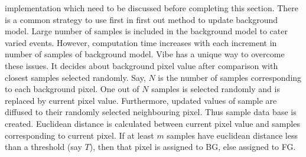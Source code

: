 implementation which need to be discussed before completing this
section. There is a common strategy to use first in first out method to
update background model. Large number of samples is included in the
background model to cater varied events. However, computation time
increases with each increment in number of samples of background model.
Vibe has a unique way to overcome these issues. It decides about
background pixel value after comparison with closest samples selected
randomly. Say, $N$ is the number of samples corresponding to each
background pixel. One out of $N$ samples is selected
randomly and is replaced by current pixel value. Furthermore,
updated values of sample are diffused to their randomly selected
neighbouring pixel. Thus sample data base is created. Euclidean distance
is calculated between current pixel value and samples corresponding to
current pixel. If at least $m$ samples have euclidean distance less than
a threshold (say $T$), then that pixel is assigned to BG, else assigned to
FG.
